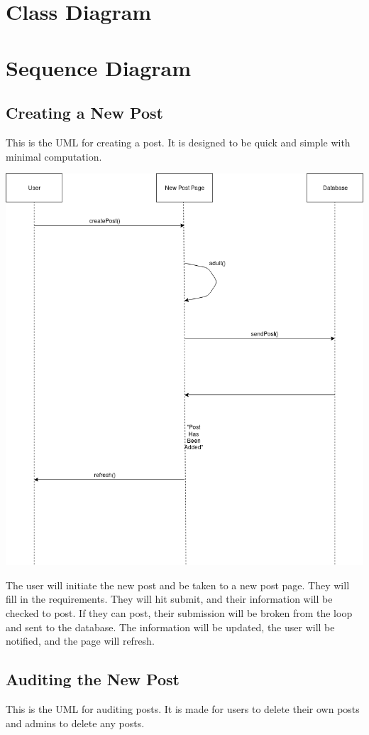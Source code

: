 \documentclass[12pt]{article}
\begin{document}
\begin{center}
\section{Class Diagram}

\section{Sequence Diagram}
\subsection{Creating a New Post}
This is the UML for creating a post. It is designed to be quick and simple with minimal computation.

\includegraphics[scale=0.85]{img/uml/createPost}

The user will initiate the new post and be taken to a new post page. They will fill in the requirements. They will hit submit, and their information will be checked to post. If they can post, their submission will be broken from the loop and sent to the database. The information will be updated, the user will be notified, and the page will refresh.
\subsection{Auditing the New Post}
This is the UML for auditing posts. It is made for users to delete their own posts and admins to delete any posts.


\end{center}
\end{document}
